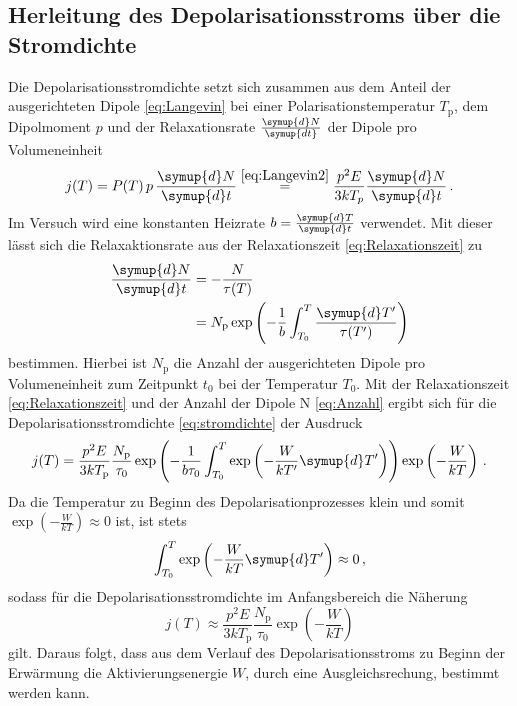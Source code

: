 \subsection{Herleitung des Depolarisationsstroms über die Stromdichte}
Die Depolarisationsstromdichte setzt sich zusammen aus dem Anteil der ausgerichteten Dipole \eqref{eq:Langevin} bei einer Polarisationstemperatur $T_\text{p}$, dem Dipolmoment $p$ und der Relaxationsrate $\frac{\symup{d}N}{\symup{dt}}$ der Dipole pro Volumeneinheit
\begin{equation}
    j(T)=P(T)\, p \,\frac{\symup{d}N}{\symup{d}t} \stackrel{\eqref{eq:Langevin2}}{=} \frac{p^2 E}{3kT_p}\frac{\symup{d}N}{\symup{d}t} \, .
    \label{eq:stromdichte}
\end{equation}
Im Versuch wird eine konstanten Heizrate $b = \frac{\symup{d}T}{\symup{d}t}$ verwendet.
Mit dieser lässt sich die Relaxaktionsrate aus der Relaxationszeit \eqref{eq:Relaxationszeit} zu
\begin{align}
    \frac{\symup{d}N}{\symup{d}t} & = -\frac{N}{\tau(T)}\notag \\
    & = N_\text{p}\exp\left(-\frac{1}{b}\int_{T_0}^T \frac{\symup{d}T'}{\tau(T')}\right)
    \label{eq:Anzahl}
\end{align}
bestimmen.
Hierbei ist $N_\text{p}$ die Anzahl der ausgerichteten Dipole pro Volumeneinheit zum Zeitpunkt $t_0$ bei der Temperatur $T_0$.
Mit der Relaxationszeit \eqref{eq:Relaxationszeit} und der Anzahl der Dipole N \eqref{eq:Anzahl} ergibt sich für die Depolarisationsstromdichte \eqref{eq:stromdichte} der Ausdruck
\begin{equation}\label{eq:stromdichte2}
    j(T)= \frac{p^2E}{3kT_\text{p}}\frac{N_\text{p}}{\tau_0}\exp\left(-\frac{1}{b\tau_0}\int_{T_0}^T \exp\left(-\frac{W}{kT'}\symup{d}T'\right) \right)\exp\left(-\frac{W}{kT}\right)\, .
\end{equation}
Da die Temperatur zu Beginn des Depolarisationprozesses klein und somit $\exp(-\frac{W}{kT})\approx 0$ ist, ist stets
\begin{equation*}
    \int_{T_0}^T \exp\left(-\frac{W}{kT}\symup{d}T' \right) \approx 0\, ,
\end{equation*}
sodass für die Depolarisationsstromdichte im Anfangsbereich die Näherung
\begin{equation}
    j(T) \approx \frac{p^2 E}{3kT_\text{p}}\frac{N_\text{p}}{\tau_0}\exp\left(-\frac{W}{kT}\right)
    \label{eq:anlauf}
\end{equation}
gilt.
Daraus folgt, dass aus dem Verlauf des Depolarisationsstroms zu Beginn der Erwärmung die Aktivierungsenergie $W$, durch eine Ausgleichsrechung, bestimmt werden kann.
